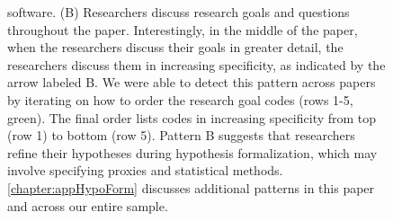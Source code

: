 {\begin{figure}
\begin{small}
\begin{minipage}{\linewidth}
            software. (B) Researchers discuss research goals and questions
            throughout the paper. Interestingly, in the middle of the paper,
            when the researchers discuss their goals in greater detail, the
            researchers discuss them in increasing specificity, as indicated by
            the arrow labeled B. We were able to detect this pattern across
            papers by iterating on how to order the research goal codes (rows
            1-5, green). The final order lists codes in increasing specificity
            from top (row 1) to bottom (row 5). Pattern B suggests that
            researchers refine their hypotheses during hypothesis formalization,
            which may involve specifying proxies and statistical methods.
            \autoref{chapter:appHypoForm} discusses additional patterns in this paper
            and across our entire sample. 
            \end{minipage}
        \end{small}
    \end{figure}
}